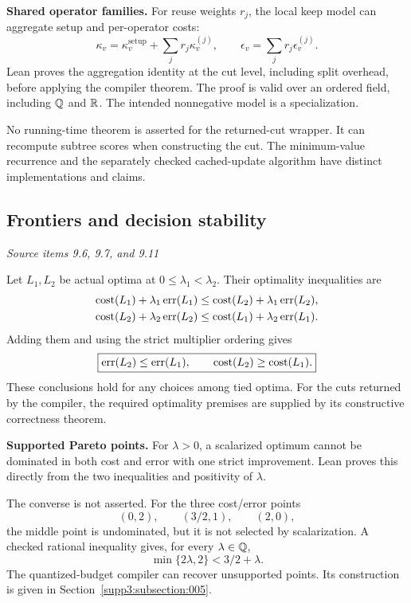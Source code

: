 \textbf{Shared operator families.} For reuse weights $r_j$, the local keep model can aggregate setup and per-operator costs:
\[
\kappa_v=\kappa_v^{\mathrm{setup}}+\sum_jr_j\kappa_v^{(j)},
\qquad \epsilon_v=\sum_jr_j\epsilon_v^{(j)}.
\]
Lean proves the aggregation identity at the cut level, including split overhead, before applying the compiler theorem. The proof is valid over an ordered field, including $\Q$ and $\R$. The intended nonnegative model is a specialization.

No running-time theorem is asserted for the returned-cut wrapper. It can recompute subtree scores when constructing the cut. The minimum-value recurrence and the separately checked cached-update algorithm have distinct implementations and claims.



\subsection{Frontiers and decision stability}\label{supp2:subsection:002}\textit{Source items 9.6, 9.7, and 9.11}\par
Let $L_1,L_2$ be actual optima at $0\leq\lambda_1<\lambda_2$. Their optimality inequalities are
\begin{align*}
\operatorname{cost}(L_1)+\lambda_1\operatorname{err}(L_1)&\leq\operatorname{cost}(L_2)+\lambda_1\operatorname{err}(L_2),\\
\operatorname{cost}(L_2)+\lambda_2\operatorname{err}(L_2)&\leq\operatorname{cost}(L_1)+\lambda_2\operatorname{err}(L_1).
\end{align*}
Adding them and using the strict multiplier ordering gives
\[
\boxed{\operatorname{err}(L_2)\leq\operatorname{err}(L_1),\qquad \operatorname{cost}(L_2)\geq\operatorname{cost}(L_1).}
\]
These conclusions hold for any choices among tied optima. For the cuts returned by the compiler, the required optimality premises are supplied by its constructive correctness theorem.

\textbf{Supported Pareto points.} For $\lambda>0$, a scalarized optimum cannot be dominated in both cost and error with one strict improvement. Lean proves this directly from the two inequalities and positivity of $\lambda$.

The converse is not asserted. For the three cost/error points
\[
(0,2),\qquad (3/2,1),\qquad (2,0),
\]
the middle point is undominated, but it is not selected by scalarization. A checked rational inequality gives, for every $\lambda\in\Q$,
\[
\min\{2\lambda,2\}<3/2+\lambda.
\]
The quantized-budget compiler can recover unsupported points. Its construction is given in Section~\ref{supp3:subsection:005}.


